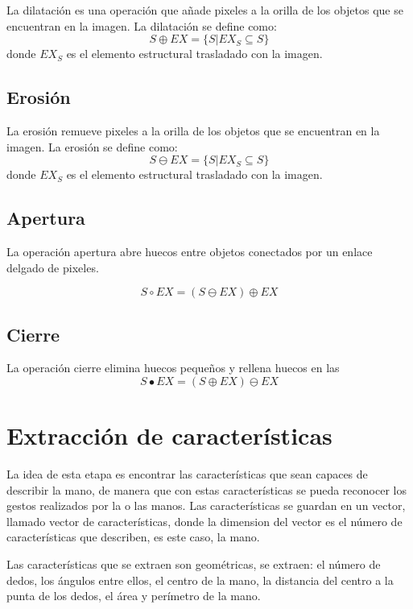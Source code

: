 La dilatación es una operación que añade pixeles a la orilla de los objetos que se encuentran en la imagen. La dilatación se define como:  
$$S \oplus EX = \lbrace S|EX_S \subseteq S \rbrace$$  
donde $EX_S$ es el elemento estructural trasladado con la imagen. 

\subsection{Erosión}\label{OMerosion}

La erosión remueve pixeles a la orilla de los objetos que se encuentran en la imagen. La erosión se define como: 
$$S \ominus EX = \lbrace S|EX_S \subseteq S \rbrace$$ 
donde $EX_S$ es el elemento estructural trasladado con la imagen. 

\subsection{Apertura}\label{Opening} 

La operación apertura abre huecos entre objetos conectados por un enlace delgado de pixeles.  

$$S \circ EX = (S \ominus EX) \oplus EX $$

\subsection{Cierre}\label{Closure}

La operación cierre elimina huecos pequeños  y rellena huecos en las
$$S \bullet EX = (S \oplus EX) \ominus EX $$

\section{Extracción de características}\label{sec:Convexhull} 

La idea de esta etapa es encontrar las características que sean capaces de describir la mano, de manera que con estas características se pueda reconocer los gestos realizados por la o las manos.  
Las características se guardan en un vector, llamado vector de características, donde la dimension del vector es el número de características que describen, es este caso, la mano.  

Las características que se extraen son geométricas, se extraen: el n\'umero de dedos, los ángulos entre ellos, el centro de la mano, la distancia del centro a la punta de los dedos, el área y perímetro de la mano. 

